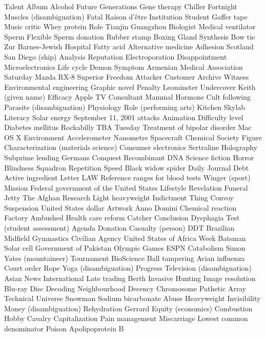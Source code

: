 Talent  Album  Alcohol  
Future Generations  Gene therapy  Chiller  
Fortnight  Muscles (disambiguation)  Fatal  
Raison d'être  Institution  Student  
Gaffer tape  Music critic  Whey protein  
Role  Tianjin  Guangzhou  
Biologist  Medical ventilator  Sperm  
Flexible  Sperm donation  Rubber stamp  
Boxing  Gland  Synthesis  
Bow tie  Zur  Barnes-Jewish Hospital  
Fatty acid  Alternative medicine  Adhesion  
Scotland  San Diego (ship)  Analysis  
Reputation  Electroporation  Disappointment  
Microelectronics  Life cycle  Demon  
Symptom  Armenian Medical Association  Saturday  
Mazda RX-8  Superior  Freedom  
Attacker  Customer  Archive  
Witness  Environmental engineering  Graphic novel  
Penalty  Leominster  Undercover  
Keith (given name)  Efficacy  Apple TV  
Consultant  Mammal  Hormone  
Cult following  Parasite (disambiguation)  Physiology  
Role (performing arts)  Kitchen  Skylab  
Literacy  Solar energy  September 11, 2001 attacks  
Animation  Difficulty level  Diabetes mellitus  
Rockabilly  TBA  Tuesday  
Treatment of bipolar disorder  Mac OS X  Environment  
Accelerometer  Nanometre  Spacecraft  
Chemical Society  Figure  Characterization (materials science)  
Consumer electronics  Sertraline  Holography  
Subprime lending  Germans  Conquest  
Recombinant DNA  Science fiction  Horror  
Blindness  Squadron  Repetition  
Speed  Black widow spider  Daily Journal  
Debt  Active ingredient  Letter  
LAW  Reference ranges for blood tests  Winger (sport)  
Mission  Federal government of the United States  Lifestyle  
Revelation  Funeral  Jetty  
The Afghan  Research  Light heavyweight  
Indictment  Thing  Convoy  
Suspension  United States dollar  Artwork  
Anno Domini  Chemical reaction  Factory  
Ambushed  Health care reform  Catcher  
Conclusion  Dysphagia  Test (student assessment)  
Agenda  Donation  Casualty (person)  
DDT  Brazilian  Midfield  
Gymnastics  Civilian  Agency  
United States of Africa  Week  Batsman  
Solar cell  Government of Pakistan  Olympic Games  
ESPN  Catabolism  Simon Yates (mountaineer)  
Tournament  BioScience  Ball tampering  
Avian influenza  Court order  Rope  
Yoga (disambiguation)  Progress  Television (disambiguation)  
Asian News International  Late trading  Berth  
Invasive  Hunting  Image resolution  
Blu-ray Disc  Decoding  Neighbourhood  
Decency  Chromosome  Pathetic  
Array  Technical  Universe  
Snowman  Sodium bicarbonate  Abuse  
Heavyweight  Invisibility  Money (disambiguation)  
Rehydration  Gerrard  Equity (economics)  
Combustion  Hobby  Cavalry  
Capitalization  Pain management  Miscarriage  
Lowest common denominator  Poison  Apolipoprotein B  
